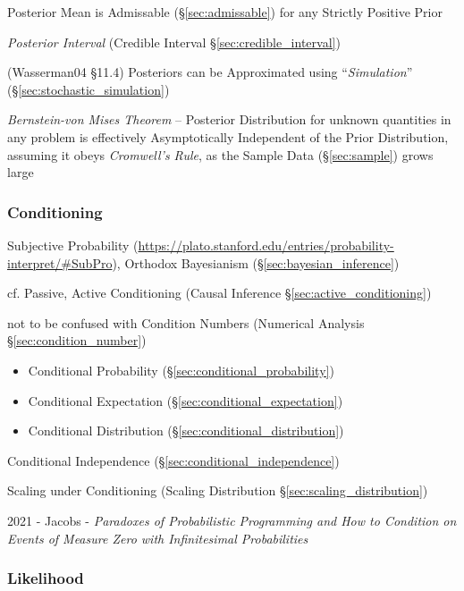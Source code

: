 Posterior Mean is Admissable (\S\ref{sec:admissable}) for any Strictly Positive
Prior

\emph{Posterior Interval} (Credible Interval \S\ref{sec:credible_interval})

(Wasserman04 \S11.4) Posteriors can be Approximated using ``\emph{Simulation}''
(\S\ref{sec:stochastic_simulation})

\emph{Bernstein-von Mises Theorem} -- Posterior Distribution for unknown
quantities in any problem is effectively Asymptotically Independent of the Prior
Distribution, assuming it obeys \emph{Cromwell's Rule}, as the Sample Data
(\S\ref{sec:sample}) grows large



\subsubsection{Conditioning}\label{sec:conditioning}

Subjective Probability
(\url{https://plato.stanford.edu/entries/probability-interpret/#SubPro}),
Orthodox Bayesianism (\S\ref{sec:bayesian_inference})

\fist cf. Passive, Active Conditioning (Causal Inference
\S\ref{sec:active_conditioning})

\fist not to be confused with Condition Numbers (Numerical Analysis
\S\ref{sec:condition_number})

\begin{itemize}
  \item Conditional Probability (\S\ref{sec:conditional_probability})
  \item Conditional Expectation (\S\ref{sec:conditional_expectation})
  \item Conditional Distribution (\S\ref{sec:conditional_distribution})
\end{itemize}

\fist Conditional Independence (\S\ref{sec:conditional_independence})

\fist Scaling under Conditioning (Scaling Distribution
\S\ref{sec:scaling_distribution})

2021 - Jacobs - \emph{Paradoxes of Probabilistic Programming and How to
Condition on Events of Measure Zero with Infinitesimal Probabilities}



\subsubsection{Likelihood}\label{sec:likelihood}

